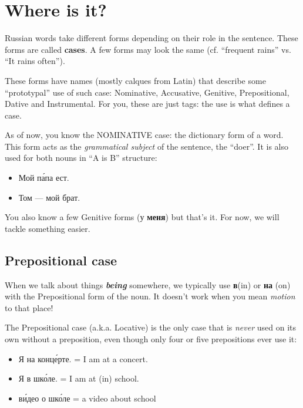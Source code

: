 \chapter{Where is it?}\label{where-is-it}

Russian words take different forms depending on their role in the
sentence. These forms are called \textbf{cases}. A few forms may look
the same (cf. ``frequent rains'' vs. ``It rains often'').

These forms have names (mostly calques from Latin) that describe some
``prototypal'' use of such case: Nominative, Accusative, Genitive,
Prepositional, Dative and Instrumental. For you, these are just tags:
the use is what defines a case.

As of now, you know the NOMINATIVE case: the dictionary form of a word.
This form acts as the \emph{grammatical subject} of the sentence, the
``doer''. It is also used for both nouns in ``A is B'' structure:

\begin{itemize}
\tightlist
\item
  Мой п\'{а}па ест.
\item
  Том --- мой брат.
\end{itemize}

You also know a few Genitive forms (у \textbf{меня}) but that's it. For
now, we will tackle something easier.

\section{Prepositional case}\label{prepositional-case}

When we talk about things \textbf{\emph{being}} somewhere, we typically
use \textbf{в}(in) or \textbf{на} (on) with the Prepositional form of
the noun. It doesn't work when you mean \emph{motion} to that place!

The Prepositional case (a.k.a. Locative) is the only case that is
\emph{never} used on its own without a preposition, even though only
four or five prepositions ever use it:

\begin{itemize}
\tightlist
\item
  Я на конц\'{е}рте. = I am at a concert.
\item
  Я в шк\'{о}ле. = I am at (in) school.
\item
  в\'{и}део о шк\'{о}ле = a video about school
\end{itemize}

